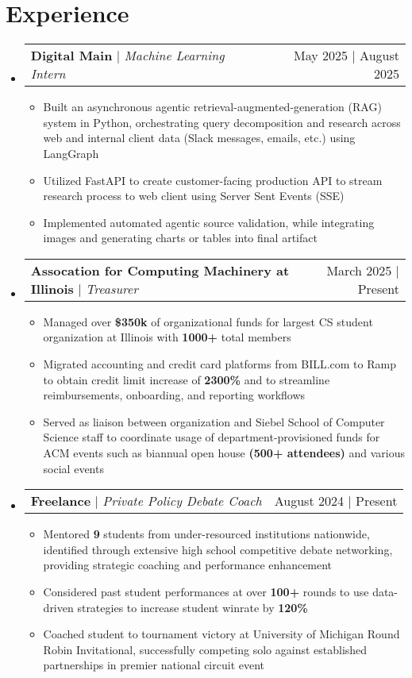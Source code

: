 \documentclass{article}
\makeatletter
\newcommand{\resumeItem}[1]{
  \item\small{
    {#1 \vspace{-2pt}}
  }
}
\newcommand{\resumeProjectHeading}[2]{
    \item
    \begin{tabular*}{0.97\textwidth}{l@{\extracolsep{\fill}}r}
      \small#1 & #2 \\
    \end{tabular*}\vspace{-7pt}
}
\newcommand{\resumeSubHeadingListStart}{\begin{itemize}[leftmargin=0.15in, label={}]}
\newcommand{\resumeSubHeadingListEnd}{\end{itemize}}
\newcommand{\resumeItemListStart}{\begin{itemize}}
\newcommand{\resumeItemListEnd}{\end{itemize}\vspace{-5pt}}
\makeatother
\begin{document}
\section{Experience}
\resumeSubHeadingListStart
\resumeProjectHeading
{\textbf{Digital Main} $|$ {\footnotesize\emph{Machine Learning Intern}}}{May 2025 | August 2025}
\resumeItemListStart
\resumeItem{Built an asynchronous agentic retrieval-augmented-generation (RAG) system in Python, orchestrating query decomposition and research across web and internal client data (Slack messages, emails, etc.) using LangGraph}
\resumeItem{Utilized FastAPI to create customer-facing production API to stream research process to web client using Server Sent Events (SSE)}
\resumeItem{Implemented automated agentic source validation, while integrating images and generating charts or tables into final artifact}
\resumeItemListEnd
\resumeProjectHeading {\textbf{Assocation for Computing Machinery at Illinois} $|$ {\footnotesize\emph{Treasurer}}}{March 2025 | Present}
\resumeItemListStart
\resumeItem{Managed over \textbf{\$350k} of organizational funds for largest CS student organization at Illinois with \textbf{1000+} total members}
\resumeItem{Migrated accounting and credit card platforms from BILL.com to Ramp to obtain credit limit increase of \textbf{2300\%} and to streamline reimbursements, onboarding, and reporting workflows} 
\resumeItem{Served as liaison between organization and Siebel School of Computer Science staff to coordinate usage of department-provisioned funds for ACM events such as biannual open house \textbf{(500+ attendees)} and various social events}
\resumeItemListEnd

\resumeProjectHeading
{\textbf{Freelance} $|$ {\footnotesize\emph{Private Policy Debate Coach}}}{August 2024 | Present}
\resumeItemListStart
\resumeItem{Mentored \textbf{9} students from under-resourced institutions nationwide, identified through extensive high school competitive debate networking, providing strategic coaching and performance enhancement}
\resumeItem{Considered past student performances at over \textbf{100+} rounds to use data-driven strategies to increase student winrate by \textbf{120\%}}
\resumeItem{Coached student to tournament victory at University of Michigan Round Robin Invitational, successfully competing solo against established partnerships in premier national circuit event}
\resumeItemListEnd
\resumeSubHeadingListEnd

\vspace{-7.5pt}
\end{document}
